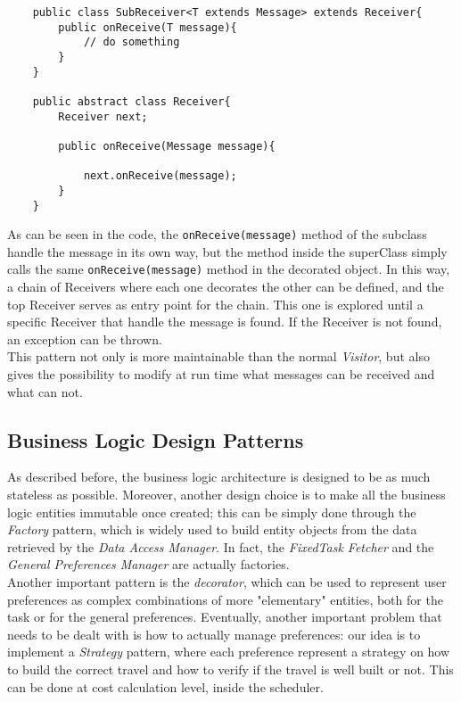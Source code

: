 \begin{verbatim}
    public class SubReceiver<T extends Message> extends Receiver{
        public onReceive(T message){
            // do something
        }
    }
    
    public abstract class Receiver{
        Receiver next;
        
        public onReceive(Message message){
        
            next.onReceive(message);
        }
    }
\end{verbatim}

As can be seen in the code, the \texttt{onReceive(message)} method of the subclass handle the message in its own way, but the method inside the superClass simply calls the same \texttt{onReceive(message)} method in the decorated object. In this way, a chain of Receivers where each one decorates the other can be defined, and the top Receiver serves as entry point for the chain. This one is explored until a specific Receiver that handle the message is found. If the Receiver is not found, an exception can be thrown.\\ 

This pattern not only is more maintainable than the normal \emph{Visitor}, but also gives the possibility to modify at run time what messages can be received and what can not.


\subsection{Business Logic Design Patterns}

As described before, the business logic architecture is designed to be as much stateless as possible. Moreover, another design choice is to make all the business logic entities immutable once created; this can be simply done through the \emph{Factory} pattern, which is widely used to build entity objects from the data retrieved by the \emph{Data Access Manager}. In fact, the \emph{FixedTask Fetcher} and the \emph{General Preferences Manager} are actually factories.  \\
Another important pattern is the \emph{decorator}, which can be used to represent  user preferences as complex combinations of more "elementary" entities, both for the task or for the general preferences. 
Eventually, another important problem that needs to be dealt with is how to actually manage preferences: our idea is to implement a \emph{Strategy} pattern, where each preference represent a strategy on how to build the correct travel and how to verify if the travel is well built or not. This can be done at cost calculation level, inside the scheduler.